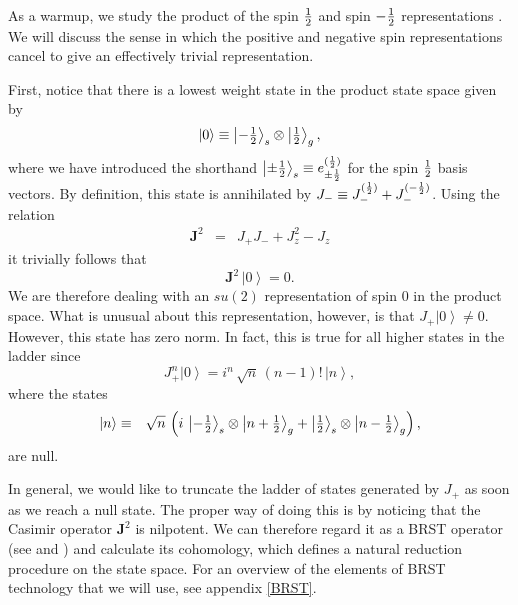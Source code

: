 \documentclass[a4paper,dvips,12pt]{article}
\newcommand {\half} {{1 \over 2}}
\newcommand {\hhalf} {{\textstyle{1 \over 2}}}
\newcommand {\ket}[1] {\left| #1 \right>}
\begin{document}
    As a warmup, we study the product
    of the spin $\half$ and spin $-\half$ representations \cite{MYSELF}.
    We will discuss the
    sense in which the positive and negative spin representations cancel
    to give an effectively trivial representation.

    First, notice that there is a lowest weight state in the
    product state space given by
    \[
        \ket{0}\equiv\ket{\textstyle
        -\half}_{s}\otimes\ket{\hhalf}_{g},
    \]
    where we have introduced the shorthand $\ket{\textstyle{\pm \half}}_s \equiv
    e^{(\half)}_{\pm \half}$ for the spin $\half$ basis vectors.
    By definition, this state is annihilated by
    $J_- \equiv J_-^{(\half)} + J_-^{(-\half)}$.
    Using the relation
    \begin{eqnarray}
        \mathbf{J}^2 &=& J_+ J_- + J_z^2 - J_z\nonumber
    \end{eqnarray}
    it trivially follows that
    \[
        \mathbf{J}^2 \, \ket{0} = 0.
    \]
    We are therefore dealing with an $su(2)$ representation of
    spin $0$ in the product space.  What is unusual about this
    representation, however, is that $J_+ \ket{0} \ne
    0$.  However, this state has zero norm.
    In fact, this is true for all higher states in the ladder since
    \[
        J_+^{n} \ket{0} = i^n \,\sqrt {n}\,(n-1)! \, \ket{n},
    \]
    where the states
    \begin{eqnarray}
        \ket{n} &\equiv& \sqrt{n}\,\left(i\,\ket{-\hhalf}_s\otimes\ket{n+\hhalf}_g
                    +
                    \ket{\hhalf}_s\otimes\ket{n-\hhalf}_g\right),
                    \nonumber\\
    \end{eqnarray}
    are null.

    In general, we would like to truncate the ladder of states
    generated by $J_+$ as soon as we reach a null state.  The
    proper way of doing this is by noticing that the Casimir
    operator $\mathbf{J}^2$ is nilpotent.  We can therefore
    regard it as a BRST operator (see \cite{BRST} and \cite{HENNEAUX})
    and calculate its cohomology,
    which defines a natural reduction procedure on the state
    space. For an overview of the elements of BRST technology that
    we will use, see appendix \ref{BRST}.
\end{document}
